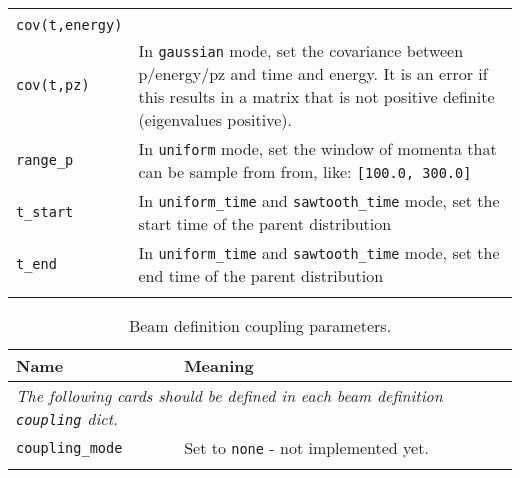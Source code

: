\begin{table*}
\begin{center}
\begin{tabularx}{\linewidth}{lX}
\hline
\begin{tabular}{l} \verb|cov(t,p)| \\ \verb|cov(t,energy)| \\ \verb|cov(t,pz)| \end{tabular} & In \verb|gaussian| mode, set the covariance between p/energy/pz and time and energy. It is an error if this results in a matrix that is not positive definite (eigenvalues positive).\\
\hline
\verb|range_p| & In \verb|uniform| mode, set the window of momenta that can be sample from from, like: \verb|[100.0, 300.0]|\\
\hline
\verb|t_start| & In \verb|uniform_time| and \verb|sawtooth_time| mode, set the start time of the parent distribution \\
\verb|t_end| & In \verb|uniform_time| and \verb|sawtooth_time| mode, set the end time of the parent distribution \\
\begin{makeimage} %
\end{makeimage} 
\end{tabularx}
\end{center}
\end{table*}

\begin{table*}
\begin{center}
\caption{Beam definition coupling parameters.}
\begin{tabularx}{\linewidth}{lX}
Name & Meaning \\
\hline
\multicolumn{2}{l}{\emph{The following cards should be defined in each beam definition \verb|coupling| dict.}} \\
\hline
\verb|coupling_mode| & Set to \verb|none| - not implemented yet. \\
\begin{makeimage} %
\end{makeimage} 
\end{tabularx}
\end{center}
\end{table*}


